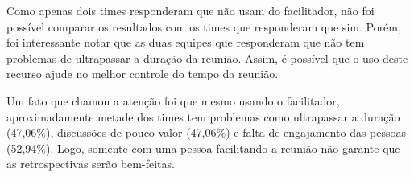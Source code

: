 Como apenas dois times responderam que não usam do facilitador, não foi possível comparar os resultados com os times que responderam que sim. Porém, foi interessante notar que as duas equipes que responderam que não tem problemas de ultrapassar a duração da reunião. Assim, é possível que o uso deste recurso ajude no melhor controle do tempo da reunião.

Um fato que chamou a atenção foi que mesmo usando o facilitador, aproximadamente metade dos times tem problemas como ultrapassar a duração (47,06\%), discussões de pouco valor (47,06\%) e falta de engajamento das pessoas (52,94\%). Logo, somente com uma pessoa facilitando a reunião não garante que as retrospectivas serão bem-feitas.
